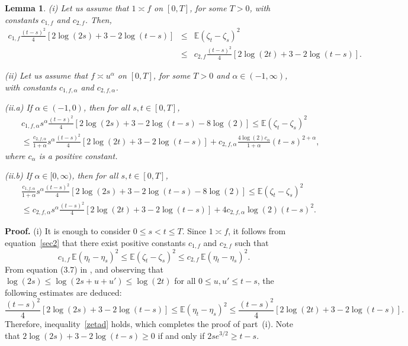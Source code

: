 \documentclass[preprint,12pt,authoryear]{elsarticle}
\def\E{\mathbb{E}}
\newtheorem{lem}[thm]{Lemma}
\begin{document}
\begin{lem}\label{lemA}
(i) Let us assume that \( 1 \asymp f \) on \( [0,T] \), for some \( T>0 \), with constants \( c_{1,f} \) and \( c_{2,f} \). Then,
{\small
\begin{eqnarray}\label{zetad}
   c_{1,f}\frac{(t-s)^2}{4}\left[2\log(2s)+3-2\log(t-s)\right] &\leq& \E(\zeta_{t}-\zeta_{s})^2 \\
   &\leq& c_{2,f}\frac{(t-s)^2}{4}\left[2\log(2t)+3-2\log(t-s)\right].\nonumber
\end{eqnarray}}

(ii) Let us assume that \( f \asymp u^{\alpha} \) on \( [0,T] \), for some \( T>0 \) and \( \alpha \in (-1,\infty) \), with constants \( c_{1,f,\alpha} \) and \( c_{2,f,\alpha} \).

(ii.a) If \( \alpha \in (-1,0) \), then for all \( s,t \in [0,T] \),
{\small
\begin{eqnarray}\label{zetad2}
&& c_{1,f,\alpha}s^{\alpha}\frac{(t-s)^2}{4}\left[2\log(2s)+3-2\log(t-s)-8\log(2)\right] \leq \E(\zeta_{t}-\zeta_{s})^2 \\\nonumber
&& \leq \frac{c_{2,f,\alpha}}{1+\alpha}s^{\alpha}\frac{(t-s)^2}{4}\left[2\log(2t)+3-2\log(t-s)\right] + c_{2,f,\alpha}\frac{4\log(2)c_{\alpha}}{1+\alpha}(t-s)^{2+\alpha},
\end{eqnarray}}
where \( c_{\alpha} \) is a positive constant.

(ii.b) If \( \alpha \in [0,\infty) \), then for all \( s,t \in [0,T] \),
{\small
\begin{eqnarray}\label{zetad3}
&& \frac{c_{1,f,\alpha}}{1+\alpha}s^{\alpha}\frac{(t-s)^2}{4}\left[2\log(2s)+3-2\log(t-s)-8\log(2)\right] \leq \E(\zeta_{t}-\zeta_{s})^2 \\\nonumber
&& \leq c_{2,f,\alpha}s^{\alpha}\frac{(t-s)^2}{4}\left[2\log(2t)+3-2\log(t-s)\right] + 4c_{2,f,\alpha}\log(2)(t-s)^2.
\end{eqnarray}}
\end{lem}


\noindent\textbf{Proof.} (i) It is enough to consider \(0 \leq s < t \leq T\). Since \(1 \asymp f\), it follows from equation~\eqref{sec2} that there exist positive constants \(c_{1,f}\) and \(c_{2,f}\) such that
\[
c_{1,f} \, \E\left(\eta_{t}-\eta_{s}\right)^2 \leq \E\left(\zeta_{t}-\zeta_{s}\right)^2 \leq c_{2,f} \, \E\left(\eta_{t}-\eta_{s}\right)^2.
\]
From equation (3.7) in \cite{BGT2007}, and observing that \( \log(2s) \leq \log(2s + u + u') \leq \log(2t) \) for all \( 0 \leq u, u' \leq t - s \), the following estimates are deduced:
\begin{equation}\label{etad}
\frac{(t-s)^2}{4}\left[2\log(2s) + 3 - 2\log(t-s)\right] \leq \E(\eta_t - \eta_s)^2 \leq \frac{(t-s)^2}{4}\left[2\log(2t) + 3 - 2\log(t-s)\right].
\end{equation}
Therefore, inequality~\eqref{zetad} holds, which completes the proof of part~(i). Note that \( 2\log(2s) + 3 - 2\log(t - s) \geq 0 \) if and only if \( 2s e^{3/2} \geq t - s \).
\end{document}
